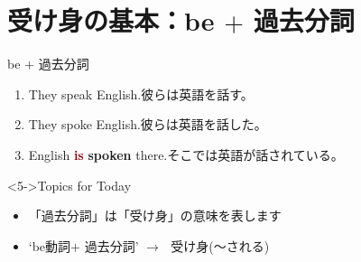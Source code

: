 \documentclass[aspectratio=169,xcolor={dvipsnames,table}]{beamer}
\newcommand{\myaudio}[1]{\href{#1}{\faVolumeUp}}
\begin{document}
\section{受け身の基本：be $+$ 過去分詞}
\begin{frame}[plain]{be $+$ 過去分詞}
 \Large
\begin{enumerate}
 \item<1-> They speak English.\hfill{}{\small 彼らは英語を話す。}
 \item<2-> They spoke English.\hfill{\small 彼らは英語を話した。}
 \item<3-> English \textcolor{Maroon}{\bfseries is} \textcolor{NavyBlue}{\bfseries spoken} there.\hfill{\small そこでは英語が話されている。}
\end{enumerate}

\begin{center}
 
\end{center}

\vfill

\hfill\myaudio{./audio/051_passive_01.mp3}
\begin{exampleblock}<5->{Topics for Today}
\begin{itemize}[square]\small
 \item 「過去分詞」は「受け身」の意味を表します
 \item `be動詞$+$ 過去分詞' $\longrightarrow$\,\,\,\,受け身(〜される)
\end{itemize}
     \end{exampleblock}
\end{frame}
\end{document}
